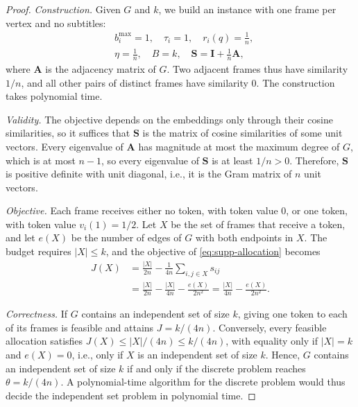 \begin{proof}
\textit{Construction.} Given $G$ and $k$, we build an instance with one frame per vertex and no subtitles:
\begin{equation}
\begin{aligned}
  &b_i^{\max}=1,\quad \tau_i=1,\quad r_i(q)=\tfrac1n,\\
  &\eta=\tfrac1n,\quad B=k,\quad \mathbf S=\mathbf I+\tfrac1n\mathbf A ,
\end{aligned}
\label{eq:supp-reduction}
\end{equation}
where $\mathbf A$ is the adjacency matrix of $G$. Two adjacent frames thus have similarity $1/n$, and all other pairs of distinct frames have similarity $0$. The construction takes polynomial time.

\textit{Validity.} The objective depends on the embeddings only through their cosine similarities, so it suffices that $\mathbf S$ is the matrix of cosine similarities of some unit vectors. Every eigenvalue of $\mathbf A$ has magnitude at most the maximum degree of $G$, which is at most $n-1$, so every eigenvalue of $\mathbf S$ is at least $1/n>0$. Therefore, $\mathbf S$ is positive definite with unit diagonal, i.e., it is the Gram matrix of $n$ unit vectors.

\textit{Objective.} Each frame receives either no token, with token value $0$, or one token, with token value $v_i(1)=1/2$. Let $X$ be the set of frames that receive a token, and let $e(X)$ be the number of edges of $G$ with both endpoints in $X$. The budget requires $|X|\le k$, and the objective of \cref{eq:supp-allocation} becomes
\begin{equation}
\begin{aligned}
  J(X)&=\frac{|X|}{2n}-\frac{1}{4n}\sum_{i,j\in X}s_{ij}\\
      &=\frac{|X|}{2n}-\frac{|X|}{4n}-\frac{e(X)}{2n^2}
       =\frac{|X|}{4n}-\frac{e(X)}{2n^2} .
\end{aligned}
\label{eq:supp-nphard}
\end{equation}

\textit{Correctness.} If $G$ contains an independent set of size $k$, giving one token to each of its frames is feasible and attains $J=k/(4n)$. Conversely, every feasible allocation satisfies $J(X)\le|X|/(4n)\le k/(4n)$, with equality only if $|X|=k$ and $e(X)=0$, i.e., only if $X$ is an independent set of size $k$. Hence, $G$ contains an independent set of size $k$ if and only if the discrete problem reaches $\theta=k/(4n)$. A polynomial-time algorithm for the discrete problem would thus decide the independent set problem in polynomial time.
\end{proof}

